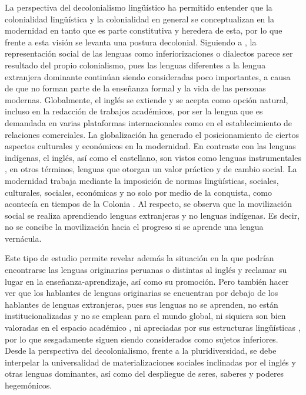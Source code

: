 \documentclass[spanish]{textolivre}
\begin{document}
La perspectiva del decolonialismo lingüístico ha permitido entender que la colonialidad lingüística y la colonialidad en general se conceptualizan en la modernidad en tanto que es parte constitutiva y heredera de esta, por lo que frente a esta visión se levanta una postura decolonial. Siguiendo a \textcite{pennycook1998english}, la representación social de las lenguas como inferiorizaciones o dialectos parece ser resultado del propio colonialismo, pues las lenguas diferentes a la lengua extranjera dominante continúan siendo consideradas poco importantes, a causa de que no forman parte de la enseñanza formal y la vida de las personas modernas. Globalmente, el inglés se extiende y se acepta como opción natural, incluso en la redacción de trabajos académicos, por ser la lengua que es demandada en varias plataformas internacionales como en el establecimiento de relaciones comerciales. La globalización ha generado el posicionamiento de ciertos aspectos culturales y económicos en la modernidad. En contraste con las lenguas indígenas, el inglés, así como el castellano, son vistos como lenguas instrumentales \cite{despagne_modernidad_2016}, en otros términos, lenguas que otorgan un valor práctico y de cambio social. La modernidad trabaja mediante la imposición de normas lingüísticas, sociales, culturales, sociales, económicas y no solo por medio de la conquista, como acontecía en tiempos de la Colonia \cite{escobar2005alla}. Al respecto, se observa que la movilización social se realiza aprendiendo lenguas extranjeras y no lenguas indígenas. Es decir, no se concibe la movilización hacia el progreso si se aprende una lengua vernácula.

Este tipo de estudio permite revelar además la situación en la que podrían encontrarse las lenguas originarias peruanas o distintas al inglés y reclamar su lugar en la enseñanza-aprendizaje, así como su promoción. Pero también hacer ver que los hablantes de lenguas originarias se encuentran por debajo de los hablantes de lenguas extranjeras, pues sus lenguas no se aprenden, no están institucionalizadas y no se emplean para el mundo global, ni siquiera son bien valoradas en el espacio académico \cite{casas_linguistic_2019}, ni apreciadas por sus estructuras lingüísticas \cite{lovon-cueva_compuestos_2021}, por lo que sesgadamente siguen siendo considerados como sujetos inferiores. Desde la perspectiva del decolonialismo, frente a la pluridiversidad, se debe interpelar la universalidad de materializaciones sociales inclinadas por el inglés y otras lenguas dominantes, así como del despliegue de seres, saberes y poderes hegemónicos.
\end{document}
